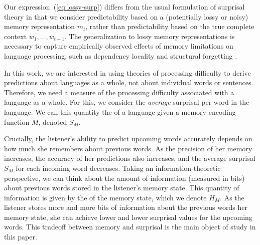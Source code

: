 


Our expression~(\ref{eq:lossy-surp}) differs from the usual formulation of surprisal theory in that we consider predictability based on a (potentially lossy or noisy) memory representation $m_t$, rather than predictability based on the true complete context $w_1, \dots, w_{t-1}$. The generalization to lossy memory representations is necessary to capture empirically observed effects of memory limitations on language processing, such as dependency locality and structural forgetting \citep{futrell2020lossy}. 

In this work, we are interested in using theories of processing difficulty to derive predictions about languages as a whole, not about individual words or sentences. Therefore, we need a measure of the processing difficulty associated with a language as a whole. For this, we consider the \emph{average} surprisal per word in the language. We call this quantity the  of a language given a memory encoding function $M$, denoted $S_M$.

Crucially, the listener's ability to predict upcoming words accurately depends on how much she remembers about previous words. As the precision of her memory increases, the accuracy of her predictions also increases, and the average surprisal $S_M$ for each incoming word decreases. Taking an information-theoretic perspective, we can think about the amount of information (measured in bits) about previous words stored in the listener's memory state. This quantity of information is given by the  of the memory state, which we denote $H_M$. As the listener stores more and more bits of information about the previous words her memory state, she can achieve lower and lower surprisal values for the upcoming words. This tradeoff between memory and surprisal is the main object of study in this paper.

